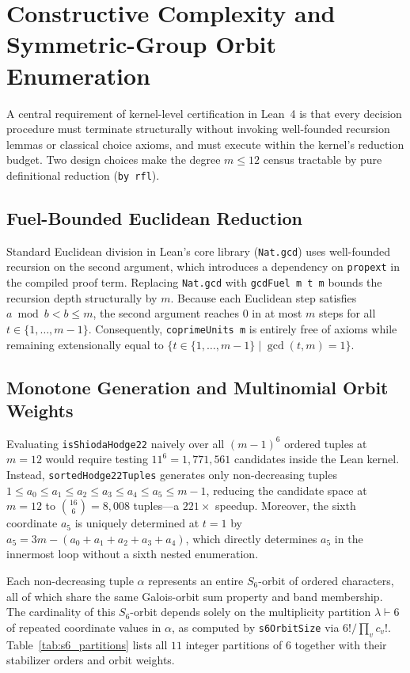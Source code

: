 \documentclass[11pt,a4paper]{article}
\begin{document}
\section{Constructive Complexity and Symmetric-Group Orbit Enumeration}

A central requirement of kernel-level certification in Lean~4 is that every decision procedure must terminate structurally without invoking well-founded recursion lemmas or classical choice axioms, and must execute within the kernel's reduction budget. Two design choices make the degree $m \le 12$ census tractable by pure definitional reduction (\texttt{by rfl}).

\subsection{Fuel-Bounded Euclidean Reduction}
Standard Euclidean division in Lean's core library (\texttt{Nat.gcd}) uses well-founded recursion on the second argument, which introduces a dependency on \texttt{propext} in the compiled proof term. Replacing \texttt{Nat.gcd} with \texttt{gcdFuel m t m} bounds the recursion depth structurally by $m$. Because each Euclidean step satisfies $a \bmod b < b \le m$, the second argument reaches $0$ in at most $m$ steps for all $t \in \{1, \dots, m-1\}$. Consequently, \texttt{coprimeUnits m} is entirely free of axioms while remaining extensionally equal to $\{t \in \{1, \dots, m-1\} \mid \gcd(t, m) = 1\}$.

\subsection{Monotone Generation and Multinomial Orbit Weights}
Evaluating \texttt{isShiodaHodge22} naively over all $(m-1)^6$ ordered tuples at $m = 12$ would require testing $11^6 = 1{,}771{,}561$ candidates inside the Lean kernel. Instead, \texttt{sortedHodge22Tuples} generates only non-decreasing tuples $1 \le a_0 \le a_1 \le a_2 \le a_3 \le a_4 \le a_5 \le m - 1$, reducing the candidate space at $m = 12$ to $\binom{16}{6} = 8{,}008$ tuples---a $221\times$ speedup. Moreover, the sixth coordinate $a_5$ is uniquely determined at $t = 1$ by $a_5 = 3m - (a_0 + a_1 + a_2 + a_3 + a_4)$, which directly determines $a_5$ in the innermost loop without a sixth nested enumeration.

Each non-decreasing tuple $\alpha$ represents an entire $S_6$-orbit of ordered characters, all of which share the same Galois-orbit sum property and band membership. The cardinality of this $S_6$-orbit depends solely on the multiplicity partition $\lambda \vdash 6$ of repeated coordinate values in $\alpha$, as computed by \texttt{s6OrbitSize} via $6! / \prod_v c_v!$. Table~\ref{tab:s6_partitions} lists all $11$ integer partitions of $6$ together with their stabilizer orders and orbit weights.
\end{document}
